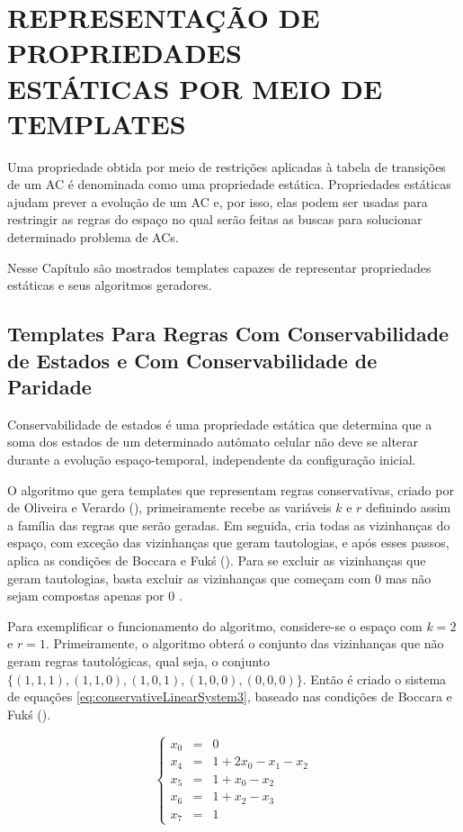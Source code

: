 \section[REPRESENTAÇÃO DE PROPRIEDADES ESTÁTICAS POR MEIO DE TEMPLATES]{REPRESENTAÇÃO DE PROPRIEDADES \\ ESTÁTICAS POR MEIO DE TEMPLATES}
\label{sec:propriedadesEstaticas}
Uma propriedade obtida por meio de restrições aplicadas à tabela de transições de um AC é denominada como uma propriedade estática. Propriedades estáticas ajudam prever a evolução de um AC e, por isso, elas podem ser usadas para restringir as regras do espaço no qual serão feitas as buscas para solucionar determinado problema de ACs.

Nesse Capítulo são mostrados templates capazes de representar propriedades estáticas e seus algoritmos geradores.

\subsection{Templates Para Regras Com Conservabilidade de Estados e Com Conservabilidade de Paridade}
Conservabilidade de estados é uma propriedade estática que determina que a soma dos estados de um determinado autômato celular não deve se alterar durante a evolução espaço-temporal, independente da configuração inicial.

O algoritmo que gera templates que representam regras conservativas, criado por de Oliveira e Verardo (\citeyear{deOliveira2014}), primeiramente recebe as variáveis $k$ e $r$ definindo assim a família das regras que serão geradas. Em seguida, cria todas as vizinhanças do espaço, com exceção das vizinhanças que geram tautologias, e após esses passos, aplica as condições de Boccara e Fukś (\citeyear{boccara2002}). Para se excluir as vizinhanças que geram tautologias, basta excluir as vizinhanças que começam com 0 mas não sejam compostas apenas por 0 \cite{Schranko2010}.

Para exemplificar o funcionamento do algoritmo, considere-se o espaço com $k=2$ e $r=1$. Primeiramente, o algoritmo obterá o conjunto das vizinhanças que não geram regras tautológicas, qual seja, o conjunto $\{(1,1,1),(1,1,0),(1,0,1),(1,0,0),(0,0,0)\}$. Então é criado o sistema de equações \eqref{eq:conservativeLinearSystem3}, baseado nas condições de Boccara e Fukś (\citeyear{boccara2002}).

\begin{equation}
\left\{\begin{matrix}
 x_0 & = & 0\\ 
 x_4 & = & 1 +2x_0 -x_1 -x_2\\ 
 x_5 & = & 1 +x_0 -x_2\\
 x_6 & = & 1 +x_2 -x_3\\ 
 x_7 & = & 1
\end{matrix}\right.
\label{eq:conservativeLinearSystem3}
\end{equation}

